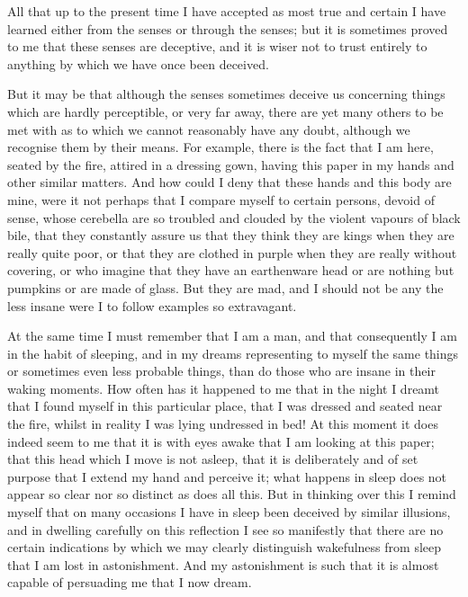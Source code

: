 All that up to the present time I have accepted as most true and
certain I have learned either from the senses or through the senses;
but it is sometimes proved to me that these senses are deceptive, and
it is wiser not to trust entirely to anything by which we have once
been deceived.

But it may be that although the senses sometimes deceive us concerning
things which are hardly perceptible, or very far away, there are yet
many others to be met with as to which we cannot reasonably have any
doubt, although we recognise them by their means. For example, there
is the fact that I am here, seated by the fire, attired in a dressing
gown, having this paper in my hands and other similar matters. And how
could I deny that these hands and this body are mine, were it not
perhaps that I compare myself to certain persons, devoid of sense,
whose cerebella are so troubled and clouded by the violent vapours of
black bile, that they constantly assure us that they think they are
kings when they are really quite poor, or that they are clothed in
purple when they are really without covering, or who imagine that they
have an earthenware head or are nothing but pumpkins or are made of
glass. But they are mad, and I should not be any the less insane were
I to follow examples so extravagant.

At the same time I must remember that I am a man, and that
consequently I am in the habit of sleeping, and in my dreams
representing to myself the same things or sometimes even less probable
things, than do those who are insane in their waking moments. How
often has it happened to me that in the night I dreamt that I found
myself in this particular place, that I was dressed and seated near
the fire, whilst in reality I was lying  undressed in bed!
At this moment it does indeed seem to me that it is with eyes awake
that I am looking at this paper; that this head which I move is not
asleep, that it is deliberately and of set purpose that I extend my
hand and perceive it; what happens in sleep does not appear so clear
nor so distinct as does all this. But in thinking over this I remind
myself that on many occasions I have in sleep been deceived by similar
illusions, and in dwelling carefully on this reflection I see so
manifestly that there are no certain indications by which we may
clearly distinguish wakefulness from sleep that I am lost in
astonishment. And my astonishment is such that it is almost capable of
persuading me that I now dream.

